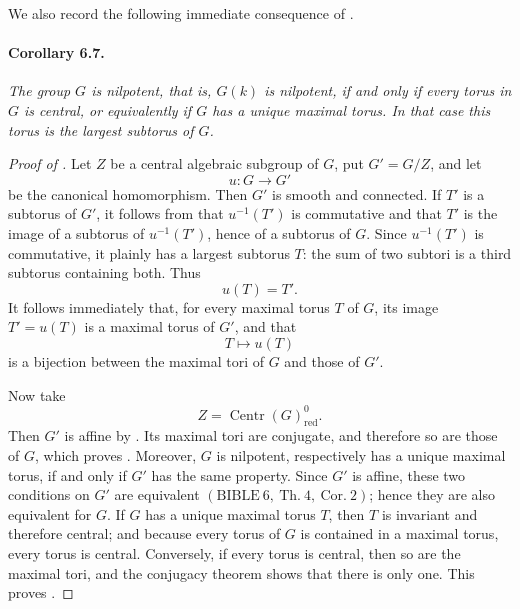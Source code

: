 We also record the following immediate consequence of
.

\paragraph{\textbf{Corollary 6.7.}}
\emph{The group \(G\) is nilpotent, that is, \(G(k)\) is nilpotent,
if and only if every torus in \(G\) is central, or equivalently if
\(G\) has a unique maximal torus. In that case this torus is the
largest subtorus of \(G\).}

\begin{proof}[Proof of ]
Let \(Z\) be a central algebraic subgroup of \(G\), put
\(G'=G/Z\), and let
\[
  u:G\longrightarrow G'
\]
be the canonical homomorphism. Then \(G'\) is smooth and connected.
If \(T'\) is a subtorus of \(G'\), it follows from  that
\(u^{-1}(T')\) is commutative and that \(T'\) is the image of a
subtorus of \(u^{-1}(T')\), hence of a subtorus of \(G\). Since
\(u^{-1}(T')\) is commutative, it plainly has a largest subtorus
\(T\): the sum of two subtori is a third subtorus containing both.
Thus
\[
  u(T)=T'.
\]
It follows immediately that, for every maximal torus \(T\) of
\(G\), its image \(T'=u(T)\) is a maximal torus of \(G'\), and that
\[
  T\longmapsto u(T)
\]
is a bijection between the maximal tori of \(G\) and those of
\(G'\).

Now take
\[
  Z=\operatorname{Centr}(G)_{\mathrm{red}}^{0}.
\]
Then \(G'\) is affine by . Its maximal tori are conjugate, and
therefore so are those of \(G\), which proves \textup{}.
Moreover, \(G\) is nilpotent, respectively has a unique maximal
torus, if and only if \(G'\) has the same property. Since \(G'\) is
affine, these two conditions on \(G'\) are equivalent
\((\mathrm{BIBLE}\ 6,\ \mathrm{Th.}\ 4,\ \mathrm{Cor.}\ 2)\);
hence they are also equivalent for \(G\). If \(G\) has a unique
maximal torus \(T\), then \(T\) is invariant and therefore central;
and because every torus of \(G\) is contained in a maximal torus,
every torus is central. Conversely, if every torus is central, then
so are the maximal tori, and the conjugacy theorem
\textup{} shows that there is only one. This proves .


\end{proof}
